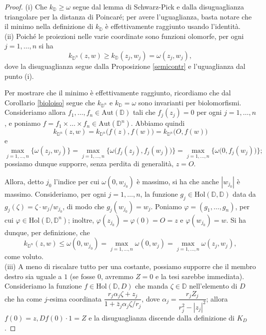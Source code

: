 \begin{proof}
    (i) Che $k_{\mathbb{D}}\ge\omega$ segue dal lemma di Schwarz-Pick e dalla disuguaglianza triangolare per la distanza di Poincaré; per avere l'uguaglianza, basta notare che il minimo nella definizione di $k_{\mathbb{D}}$ è effettivamente raggiunto usando l'identità.\\

    (ii) Poiché le proiezioni nelle varie coordinate sono funzioni olomorfe, per ogni $j=1,\dots, n$ si ha
    $$k_{\mathbb{D}^n}(z,w) \ge k_{\mathbb{D}}(z_j,w_j)=\omega(z_j,w_j),$$
    dove la disuguaglianza segue dalla Proposizione \ref{semicontr} e l'uguaglianza dal punto (i).

    Per mostrare che il minimo è effettivamente raggiunto, ricordiamo che dal Corollario \ref{bioloiso} segue che $k_{\mathbb{D}^n}$ e $k_{\mathbb{D}}=\omega$ sono invarianti per biolomorfismi. Consideriamo allora $f_1,\dots, f_n \in \text{Aut}(\mathbb{D})$ tali che $f_j(z_j)=0$ per ogni $j=1,\dots,n$, e poniamo $f=f_1\times\dots\times f_n\in\text{Aut}(\mathbb{D}^n)$. Abbiamo quindi
    $$k_{\mathbb{D}^n}(z,w)=k_{\mathbb{D}^n}\big(f(z),f(w)\big)=k_{\mathbb{D}^n}\big(O,f(w)\big)$$
    e
    $$\max_{j=1,\dots,n}\{\omega(z_j,w_j)\}=\max_{j=1,\dots,n}\big\{\omega\big(f_j(z_j),f_j(w_j)\big)\big\}=\max_{j=1,\dots,n}\big\{\omega\big(0,f_j(w_j)\big)\big\};$$
    possiamo dunque supporre, senza perdita di generalità, $z=O$.
    
    Allora, detto $j_0$ l'indice per cui $\omega(0,w_{j_0})$ è massimo, si ha che anche $|w_{j_0}|$ è massimo. Consideriamo, per ogni $j=1,\dots,n$, la funzione $g_j \in\text{Hol}(\mathbb{D},\mathbb{D})$ data da $g_j(\zeta)=\zeta\cdot w_j/w_{j_0}$, di modo che $g_j(w_{j_0})=w_j$. Poniamo $\varphi=(g_1,\dots,g_n)$, per cui $\varphi\in\text{Hol}(\mathbb{D},\mathbb{D}^n)$; inoltre, $\varphi(z_{j_0})=\varphi(0)=O=z$ e $\varphi(w_{j_0})=w$. Si ha dunque, per definizione, che
    $$k_{\mathbb{D}^n}(z,w) \le \omega(0,w_{j_0})=\max_{j=1,\dots,n}\omega(0,w_j)=\max_{j=1,\dots,n}\omega(z_j,w_j),$$
    come voluto.\\

    (iii) A meno di riscalare tutto per una costante, possiamo supporre che il membro destro sia uguale a $1$ (se fosse $0$, avremmo $Z=0$ e la tesi sarebbe immediata). Consideriamo la funzione $f\in\text{Hol}(\mathbb{D},D)$ che manda $\zeta\in\mathbb{D}$ nell'elemento di $D$ che ha come $j$-esima coordinata $\dfrac{r_j\alpha_j\zeta+z_j}{1+\bar{z}_j\alpha_j\zeta/r_j}$, dove $\alpha_j=\dfrac{r_jZ_j}{r_j^2-|z_j|^2}$; allora $f(0)=z, Df(0)\cdot 1=Z$ e la disuguaglianza discende dalla definizione di $K_D$.
\end{proof}

